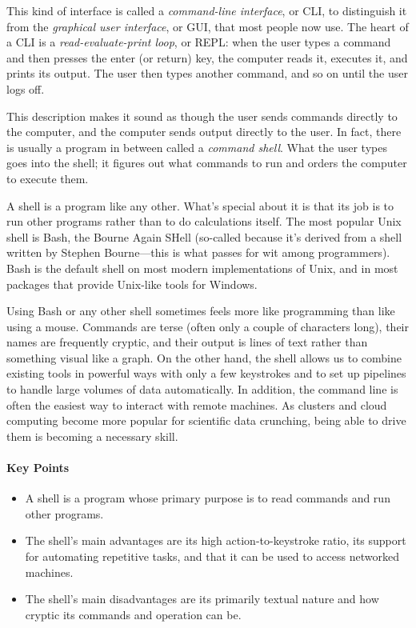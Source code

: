 \documentclass[]{book}
\newcommand{\gdef}[2]{\emph{#2}}
\begin{document}
This kind of interface is called a \gdef{g:cli}{command-line
interface}, or CLI, to distinguish it from the
\gdef{g:gui}{graphical user interface}, or GUI, that most people now
use. The heart of a CLI is a \gdef{g:repl}{read-evaluate-print
loop}, or REPL: when the user types a command and then presses the enter
(or return) key, the computer reads it, executes it, and prints its
output. The user then types another command, and so on until the user
logs off.

This description makes it sound as though the user sends commands
directly to the computer, and the computer sends output directly to the
user. In fact, there is usually a program in between called a
\gdef{g:shell}{command shell}. What the user types goes into the
shell; it figures out what commands to run and orders the computer to
execute them.

A shell is a program like any other. What's special about it is that its
job is to run other programs rather than to do calculations itself. The
most popular Unix shell is Bash, the Bourne Again SHell (so-called
because it's derived from a shell written by Stephen Bourne---this is
what passes for wit among programmers). Bash is the default shell on
most modern implementations of Unix, and in most packages that provide
Unix-like tools for Windows.

Using Bash or any other shell sometimes feels more like programming than
like using a mouse. Commands are terse (often only a couple of
characters long), their names are frequently cryptic, and their output
is lines of text rather than something visual like a graph. On the other
hand, the shell allows us to combine existing tools in powerful ways
with only a few keystrokes and to set up pipelines to handle large
volumes of data automatically. In addition, the command line is often
the easiest way to interact with remote machines. As clusters and cloud
computing become more popular for scientific data crunching, being able
to drive them is becoming a necessary skill.

\mbox{}\paragraph{Key Points}

\begin{itemize}
\item
  A shell is a program whose primary purpose is to read commands and run
  other programs.
\item
  The shell's main advantages are its high action-to-keystroke ratio,
  its support for automating repetitive tasks, and that it can be used
  to access networked machines.
\item
  The shell's main disadvantages are its primarily textual nature and
  how cryptic its commands and operation can be.
\end{itemize}
\end{document}
